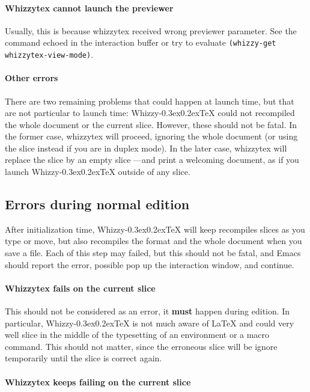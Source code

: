 \documentclass[12pt]{article}
\makeatletter
\let \lst \verb
\def \whizzy {{Whizzy\kern -0.3ex\raise 0.2ex\hbox{\let \@\relax\TeX}}}
\makeatother
\begin{document}
\paragraph {Whizzytex cannot launch the previewer}

Usually, this is because whizzytex received wrong previewer parameter.  See
the command echoed in the interaction buffer or try to evaluate
\lst"(whizzy-get whizzytex-view-mode)".

\paragraph {Other errors}

There are two remaining problems that could happen at launch time, but that
are not particular to launch time: {\whizzy} could not recompiled the whole 
document or the current slice. However, these should not be fatal. 
In the former case, whizzytex will proceed, ignoring the whole document 
(or using the slice instead if you are in duplex mode). In the later case,
whizzytex will replace the slice by an empty slice ---and print a welcoming
document, as if you launch {\whizzy} outside of any slice. 

\subsection {Errors during normal edition}

After initialization time, {\whizzy} will keep recompiles slices as you
type or move, but also recompiles the format and the whole document when you
save a file. Each of this step may failed, but this should not be fatal, and
Emacs should report the error, possible pop up the interaction window, and
continue. 

\paragraph {Whizzytex fails on the current slice}

This should not be considered as an error, it {\bf must} happen during
edition. In particular, {\whizzy} is not much aware of {\LaTeX} and could
very well slice in the middle of the typesetting of an environment or a
macro command. This should not matter, since the erroneous slice will be
ignore temporarily until the slice is correct again.

\paragraph {Whizzytex keeps failing on the current slice}
\end{document}
